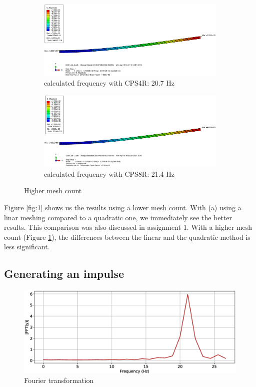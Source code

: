 \documentclass[12pt]{article}
\begin{document}
\begin{figure}[!htb]
  \centering
  \begin{subfigure}{.5\textwidth}
    \centering
    \includegraphics[width=0.95\linewidth]{pics/Beam_1_CPS4R_L}
    \caption{calculated frequency with CPS4R: 20.7 Hz}
  \end{subfigure}%
  \begin{subfigure}{.5\textwidth}
    \centering
    \includegraphics[width=0.95\linewidth]{pics/Beam_1_CPS8R_L}
    \caption{calculated frequency with CPS8R: 21.4 Hz}
   \end{subfigure}
  \caption{Higher mesh count}
  \label{fig:2}
\end{figure}

\noindent Figure \ref{fig:1} shows us the results using a lower mesh count. With (a) using a linar meshing compared to a quadratic one,
we immediately see the better results. This comparison was also discussed in assignment 1. With a higher mesh count (Figure \ref{fig:2}),
the differences between the linear and the quadratic method is less significant.
\newpage
\subsection{Generating an impulse}

\begin{figure}[!htb]
  \centering
  \includegraphics[width=0.95\linewidth]{pics/Report2}
  \caption{Fourier transformation}
\end{figure}
\end{document}
